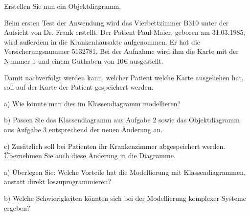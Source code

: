 \documentclass[11pt, a4paper, oneside]{article}
\begin{document}
	
	Erstellen Sie nun ein Objektdiagramm.
	
	Beim ersten Test der Anwendung wird das Vierbettzimmer B310 unter der Aufsicht von Dr. Frank erstellt.
	Der Patient Paul Maier, geboren am 31.03.1985, wird außerdem in die Krankenhausakte aufgenommen.
	Er hat die Versicherungsnummer 5132781.
	Bei der Aufnahme wird ihm die Karte mit der Nummer 1 und einem Guthaben von 10€ ausgestellt.
	
	\pagebreak
	
	Damit nachverfolgt werden kann, welcher Patient welche Karte ausgeliehen hat, soll auf der Karte der Patient gespeichert werden.
	
	a) Wie könnte man dies im Klassendiagramm modellieren?
	
	\lines[3cm]
	
	b) Passen Sie das Klassendiagramm aus Aufgabe 2 sowie das Objektdiagramm aus Aufgabe 3 entsprechend der neuen Änderung an.
	
	c) Zusätzlich soll bei Patienten ihr Krankenzimmer abgespeichert werden.
	Übernehmen Sie auch diese Änderung in die Diagramme.
	
	
	a) Überlegen Sie: Welche Vorteile hat die Modellierung mit Klassendiagrammen, anstatt direkt loszuprogrammieren?
	
	\lines[3cm]
	
	b) Welche Schwierigkeiten könnten sich bei der Modellierung komplexer Systeme ergeben?
	
	\lines[3cm]
	
\end{document}
